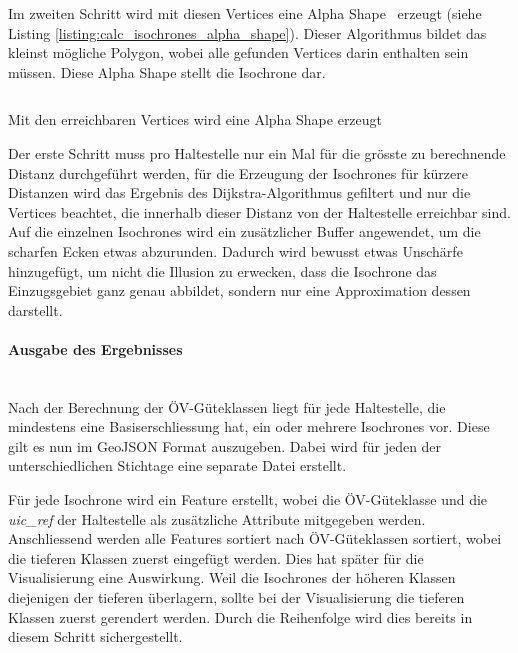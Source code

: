 Im zweiten Schritt wird mit diesen Vertices eine Alpha Shape~\cite{alpha_shapes} erzeugt (siehe Listing \ref{listing:calc_isochrones_alpha_shape}). Dieser Algorithmus bildet das kleinst mögliche Polygon, wobei alle gefunden Vertices darin enthalten sein müssen.
Diese Alpha Shape stellt die \gls{Isochrone} dar.

\begin{listing}[ht]
    \inputminted{sql}{projectdoc/listing/calc_isochrones_alpha_shape.sql}
    \caption[Berechnung der Alpha Shape]{Mit den erreichbaren Vertices wird eine Alpha Shape erzeugt}
    \label{listing:calc_isochrones_alpha_shape}
\end{listing}

Der erste Schritt muss pro Haltestelle nur ein Mal für die grösste zu berechnende Distanz durchgeführt werden, für die Erzeugung der \glspl{Isochrone} für kürzere Distanzen wird das Ergebnis des Dijkstra-Algorithmus gefiltert und nur die Vertices beachtet, die innerhalb dieser Distanz von der Haltestelle erreichbar sind.
Auf die einzelnen \glspl{Isochrone} wird ein zusätzlicher Buffer angewendet, um die scharfen Ecken etwas abzurunden.
Dadurch wird bewusst etwas Unschärfe hinzugefügt, um nicht die Illusion zu erwecken, dass die \gls{Isochrone} das Einzugsgebiet ganz genau abbildet, sondern nur eine Approximation dessen darstellt.

\paragraph{Ausgabe des Ergebnisses}~\\
Nach der Berechnung der \acs{ÖV}-Güteklassen liegt für jede Haltestelle, die mindestens eine Basiserschliessung hat, ein oder mehrere \glspl{Isochrone} vor.
Diese gilt es nun im GeoJSON Format auszugeben.
Dabei wird für jeden der unterschiedlichen Stichtage eine separate Datei erstellt.

Für jede \gls{Isochrone} wird ein Feature erstellt, wobei die \acs{ÖV}-Güteklasse und die \emph{uic\_ref} der Haltestelle als zusätzliche Attribute mitgegeben werden.
Anschliessend werden alle Features sortiert nach \acs{ÖV}-Güteklassen sortiert, wobei die tieferen Klassen zuerst eingefügt werden.
Dies hat später für die Visualisierung eine Auswirkung.
Weil die \glspl{Isochrone} der höheren Klassen diejenigen der tieferen überlagern, sollte bei der Visualisierung die tieferen Klassen zuerst gerendert werden.
Durch die Reihenfolge wird dies bereits in diesem Schritt sichergestellt.

